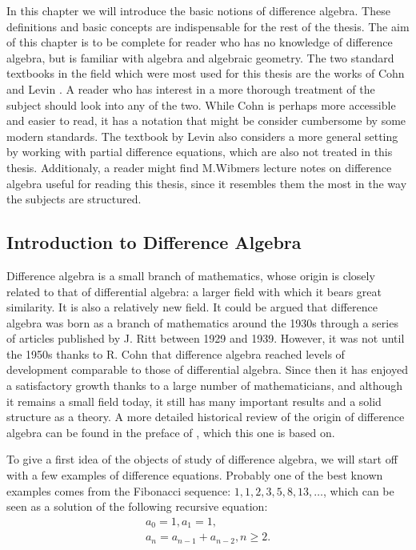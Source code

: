 In this chapter we will introduce the basic notions of difference algebra. These definitions and basic concepts are indispensable for the rest of the thesis. 
The aim of this chapter is to be complete for reader who has no knowledge of difference algebra, but is familiar with algebra and algebraic geometry. 
The two standard textbooks in the field which were most used for this thesis are the works of Cohn \cite{cohn} and Levin \cite{levin}. 
A reader who has interest in a more thorough treatment of the subject should look into any of the two. While Cohn is perhaps more accessible and easier to read, 
it has a notation that might be consider cumbersome by some modern standards. The textbook by Levin also considers a more general setting by working with partial difference equations, which are also not treated in this thesis.
Additionaly, a reader might find M.Wibmers lecture notes on difference algebra \cite{wibmer} useful for reading this thesis, since it resembles them the most in the way the subjects are structured.

\subsection{Introduction to Difference Algebra} 


Difference algebra is a small branch of mathematics, whose origin is closely related to that of differential algebra: a larger field with which it bears great similarity. It is also a relatively new field.
It could be argued that difference algebra was born as a branch of mathematics around the 1930s through a series of articles published by J. Ritt between 1929 and 1939. However, it was not until the 1950s thanks to R. Cohn 
that difference algebra reached levels of development comparable to those of differential algebra.  Since then it has enjoyed a satisfactory growth thanks to a large number of mathematicians, and although it remains a small field today,
it still has many important results and a solid structure as a theory. A more detailed historical review of the origin of difference algebra can be found in the preface of \cite{levin}, which this one is based on.



To give a first idea of the objects of study of difference algebra, we will start off with a few examples of difference equations. Probably one of the best known examples comes from the Fibonacci sequence: $1,1,2,3,5,8,13,\ldots$, which can be seen as a solution of the following recursive equation:
\begin{align*}
a_0 = 1,  a_1 = 1, \\ a_n = a_{n-1} + a_{n-2}, n\geq 2.
\end{align*}

